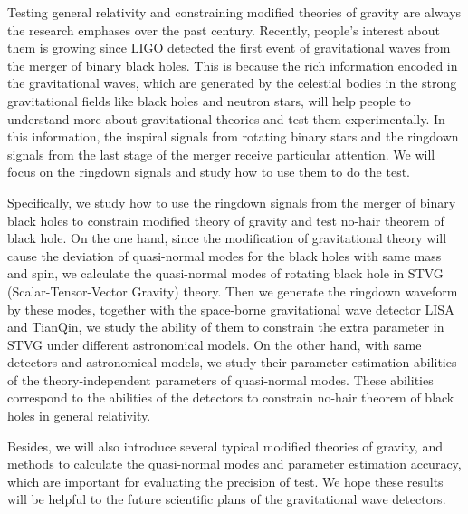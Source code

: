 \begin{eabstract}
Testing general relativity and constraining modified theories of gravity are always the research emphases over the past century. Recently, people's interest about them is growing since LIGO detected the first event of gravitational waves from the merger of binary black holes. This is because the rich information encoded in the gravitational waves, which are generated by the celestial bodies in the strong gravitational fields like black holes and neutron stars, will help people to understand more about gravitational theories and test them experimentally. In this information, the inspiral signals from rotating binary stars and the ringdown signals from the last stage of the merger receive particular attention. We will focus on the ringdown signals and study how to use them to do the test.

Specifically, we study how to use the ringdown signals from the merger of binary black holes to constrain modified theory of gravity and test no-hair theorem of black hole. On the one hand, since the modification of gravitational theory will cause the deviation of quasi-normal modes for the black holes with same mass and spin, we calculate the quasi-normal modes of rotating black hole in STVG (Scalar-Tensor-Vector Gravity) theory. Then we generate the ringdown waveform by these modes, together with the space-borne gravitational wave detector LISA and TianQin, we study the ability of them to constrain the extra parameter in STVG under different astronomical models. On the other hand, with same detectors and astronomical models, we study their parameter estimation abilities of the theory-independent parameters of quasi-normal modes. These abilities correspond to the abilities of the detectors to constrain no-hair theorem of black holes in general relativity.

Besides, we will also introduce several typical modified theories of gravity, and methods to calculate the quasi-normal modes and parameter estimation accuracy, which are important for evaluating the precision of test. We hope these results will be helpful to the future scientific plans of the gravitational wave detectors.

\end{eabstract}
